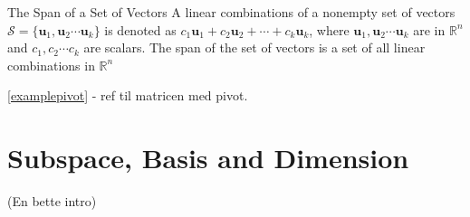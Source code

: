 \begin{definition} {The Span of a Set of Vectors}
A linear combinations of a nonempty set of vectors $\mathcal{S} = \{ \textbf{u}_1,\textbf{u}_2 \cdots \textbf{u}_k\}$ is denoted as $c_1 \textbf{u}_1 + c_2\textbf{u}_2+ \cdots+ c_k\textbf{u}_k$, where $\textbf{u}_1,\textbf{u}_2 \cdots \textbf{u}_k$ are in $\mathbb{R}^n$ and $c_1, c_2 \cdots c_k$ are scalars.
The span of the set of vectors is a set of all linear combinations in $\mathbb{R}^n$
\cite[66]{LiAl}
\end{definition}

\eqref{examplepivot} - ref til matricen med pivot.

\section{Subspace, Basis and Dimension}
(En bette intro)


